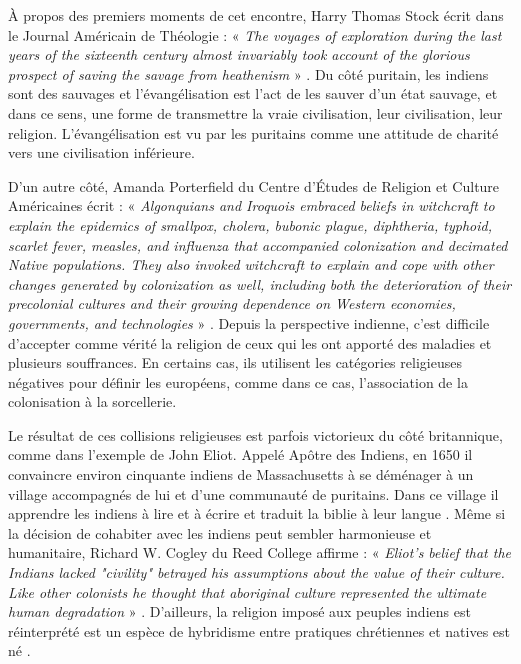 \documentclass[12pt]{article}
\begin{document}
À propos des premiers moments de cet encontre, Harry Thomas Stock écrit dans le Journal Américain de Théologie : « \emph{The voyages of exploration during the last years of the sixteenth century almost invariably took account of the glorious prospect of saving the savage from heathenism} » \cite{stock-5}. Du côté puritain, les indiens sont des sauvages et l'évangélisation est l'act de les sauver d'un état sauvage, et dans ce sens, une forme de transmettre la vraie civilisation, leur civilisation, leur religion. L'évangélisation est vu par les puritains comme une attitude de charité vers une civilisation inférieure.

D'un autre côté, Amanda Porterfield du Centre d'Études de Religion et Culture Américaines écrit : « \emph{Algonquians and Iroquois embraced beliefs in witchcraft to explain the epidemics of smallpox, cholera, bubonic plague, diphtheria, typhoid, scarlet fever, measles, and influenza that accompanied colonization and decimated Native populations. They also invoked witchcraft to explain and cope with other changes generated by colonization as well, including both the deterioration of their precolonial cultures and their growing dependence on Western economies, governments, and technologies} » \cite{poter-6}. Depuis la perspective indienne, c'est difficile d'accepter comme vérité la religion de ceux qui les ont apporté des maladies et plusieurs souffrances. En certains cas, ils utilisent les catégories religieuses négatives pour définir les européens, comme dans ce cas, l'association de la colonisation à la sorcellerie.

Le résultat de ces collisions religieuses est parfois victorieux du côté britannique, comme dans l'exemple de John Eliot. Appelé Apôtre des Indiens, en 1650 il convaincre environ cinquante indiens de Massachusetts à se déménager à un village accompagnés de lui et d'une communauté de puritains. Dans ce village il apprendre les indiens à lire et à écrire et traduit la biblie à leur langue \cite{eliot-7}. Même si la décision de cohabiter avec les indiens peut sembler harmonieuse et humanitaire, Richard W. Cogley du Reed College affirme : « \emph{Eliot's belief that the Indians lacked "civility" betrayed his assumptions about the value of their culture. Like other colonists he thought that aboriginal culture represented the ultimate human degradation} » \cite{eliot-8}. D'ailleurs, la religion imposé aux peuples indiens est réinterprété est un espèce de hybridisme entre pratiques chrétiennes et natives est né \cite{fisher-9}.
\end{document}
